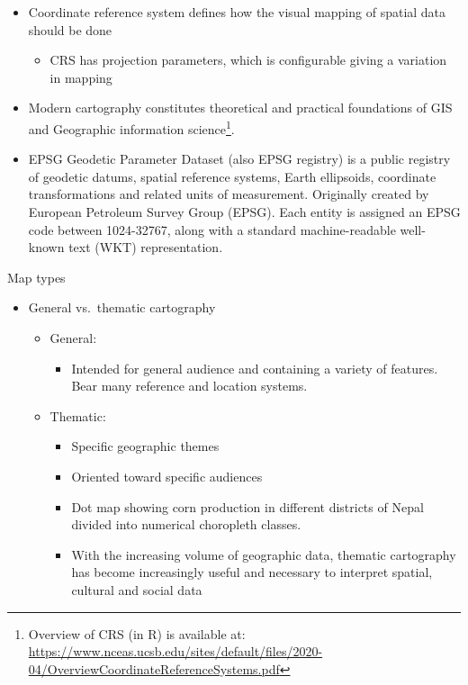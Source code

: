 \documentclass[11pt,dvipsnames,ignorenonframetext,aspectratio=169]{beamer}
\providecommand{\tightlist}{%
  \setlength{\itemsep}{0pt}\setlength{\parskip}{0pt}}
\begin{document}
\begin{frame}{}
\protect\hypertarget{section-3}{}
\begin{itemize}
\tightlist
\item
  Coordinate reference system defines how the visual mapping of spatial
  data should be done

  \begin{itemize}
  \tightlist
  \item
    CRS has projection parameters, which is configurable giving a
    variation in mapping
  \end{itemize}
\item
  Modern cartography constitutes theoretical and practical foundations
  of GIS and Geographic information
  science\footnote[frame]{Overview of CRS (in R) is available at: \url{https://www.nceas.ucsb.edu/sites/default/files/2020-04/OverviewCoordinateReferenceSystems.pdf}}.
\item
  EPSG Geodetic Parameter Dataset (also EPSG registry) is a public
  registry of geodetic datums, spatial reference systems, Earth
  ellipsoids, coordinate transformations and related units of
  measurement. Originally created by European Petroleum Survey Group
  (EPSG). Each entity is assigned an EPSG code between 1024-32767, along
  with a standard machine-readable well-known text (WKT) representation.
\end{itemize}
\end{frame}

\begin{frame}{Map types}
\protect\hypertarget{map-types}{}
\begin{itemize}
\tightlist
\item
  General vs.~thematic cartography

  \begin{itemize}
  \tightlist
  \item
    General:

    \begin{itemize}
    \tightlist
    \item
      Intended for general audience and containing a variety of
      features. Bear many reference and location systems.
    \end{itemize}
  \item
    Thematic:

    \begin{itemize}
    \tightlist
    \item
      Specific geographic themes
    \item
      Oriented toward specific audiences
    \item
      Dot map showing corn production in different districts of Nepal
      divided into numerical choropleth classes.
    \item
      With the increasing volume of geographic data, thematic
      cartography has become increasingly useful and necessary to
      interpret spatial, cultural and social data
    \end{itemize}
  \end{itemize}
\end{itemize}
\end{frame}
\end{document}
